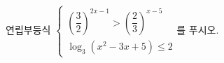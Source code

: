 연립부등식 $\begin{cases} \left(\dfrac{3}{2}\right)^{2x-1}>\left(\dfrac{2}{3}\right)^{x-5} \\[1ex] \log_3(x^{2}-3x+5)\le 2 \end{cases}$를 푸시오.

